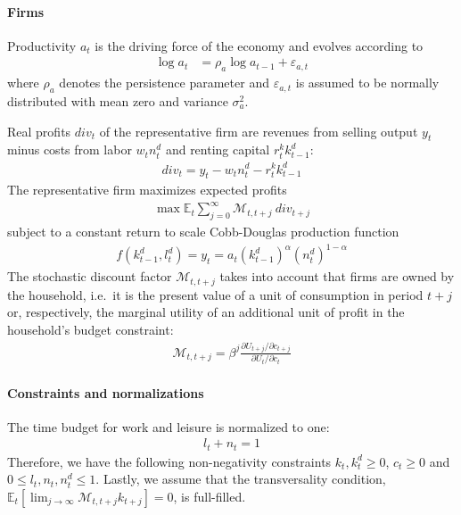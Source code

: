 \paragraph{Firms}
Productivity \(a_t\) is the driving force of the economy and evolves according to
\begin{align*}
\log{a_{t}} &= \rho_a \log{a_{t-1}}  + \varepsilon_{a,t}
\end{align*}
where \(\rho_a\) denotes the persistence parameter
and \(\varepsilon_{a,t}\) is assumed to be normally distributed with mean zero and variance \(\sigma_a^2\).
	
Real profits \({div}_t\) of the representative firm are revenues from selling output \(y_t\)
  minus costs from labor \(w_t n^{d}_{t}\) and renting capital \(r^{k}_{t} k^{d}_{t-1}\):
\begin{align*}
{div}_t = y_{t} - w_{t} n^{d}_{t} - r^{k}_{t} k^{d}_{t-1}
\end{align*}
The representative firm maximizes expected profits
\begin{align*}
\max \mathbb{E}_{t} \sum_{j=0}^{\infty} \mathcal{M}_{t,t+j}~{div}_{t+j}
\end{align*}
subject to a constant return to scale Cobb-Douglas production function
\begin{align*}
f(k^{d}_{t-1}, l^{d}_{t}) = y_t = a_t {(k^{d}_{t-1})}^\alpha {(n^{d}_{t})}^{1-\alpha}
\end{align*}
The stochastic discount factor \(\mathcal{M}_{t,t+j}\) takes into account that firms are owned by the household,
  i.e.\ it is the present value of a unit of consumption in period \(t+j\) or, respectively,
  the marginal utility of an additional unit of profit in the household's budget constraint:
\begin{align*}
\mathcal{M}_{t,t+j} = \beta^j \frac{\partial U_{t+j}/\partial c_{t+j}}{\partial U_{t}/\partial c_{t}}
\end{align*}

\paragraph{Constraints and normalizations}
The time budget for work and leisure is normalized to one:
\begin{align*}
l_t + n_t = 1
\end{align*}
Therefore, we have the following non-negativity constraints
  \(k_{t},k^{d}_{t} \geq 0\), \(c_{t} \geq 0\) and \(0 \leq l_{t},n_{t},n^{d}_{t} \leq 1\).
Lastly, we assume that the transversality condition,
  \(\mathbb{E}_{t} [\lim_{j\rightarrow \infty} \mathcal{M}_{t,t+j} k_{t+j}]=0\),
  is full-filled.

